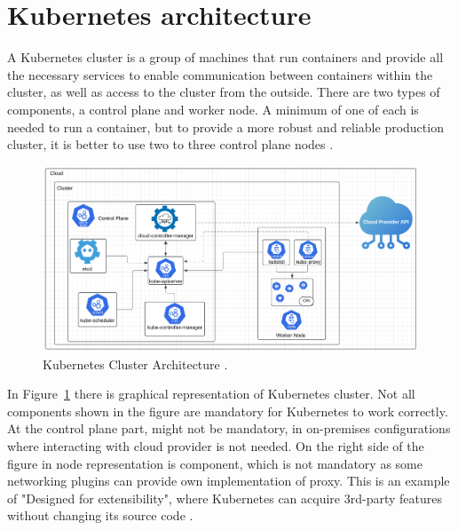 
\section{Kubernetes architecture}
\label{sec:k8s_arch}
A Kubernetes cluster is a group of machines that run containers and provide all the necessary services to enable communication between containers within the cluster, as well as access to the cluster from the outside. There are two types of components, a control plane and worker node. A minimum of one of each is needed to run a container, but to provide a more robust and reliable production cluster, it is better to use two to three control plane nodes  \cite{KubernetesDocs}. 

\begin{figure}[tbh]
    \centering
    \includegraphics[width=1\columnwidth]{images/kubernetes-cluster-architecture.png}
    \caption{Kubernetes Cluster Architecture \cite{KubernetesDocs}.}
    \label{fig:k8s_arch}
\end{figure}

In Figure~\ref{fig:k8s_arch} there is graphical representation of Kubernetes cluster. Not all components shown in the figure are mandatory for Kubernetes to work correctly. At the control plane part, \textit{} might not be mandatory, in on-premises configurations where interacting with cloud provider is not needed. On the right side of the figure in node representation is \textit{} component, which is not mandatory as some networking plugins can provide own implementation of proxy. This is an example of "Designed for extensibility", where Kubernetes can acquire 3rd-party features without changing its source code \cite{KubernetesDocs}.





